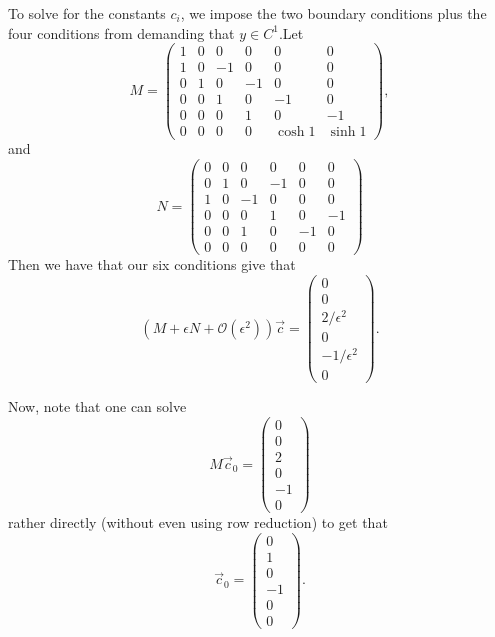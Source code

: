 \begin{example}
To solve for the constants $c_i$, we impose the two boundary conditions plus the four conditions from demanding that $y\in C^1$.Let
\begin{equation}
M = \begin{pmatrix}
1 & 0 & 0 & 0& 0 & 0\\
1 & 0 & -1 & 0 & 0 & 0\\
0 & 1 & 0 & -1 & 0 & 0\\
0 & 0 & 1 & 0 & -1 & 0\\
0 & 0 & 0 & 1 & 0 & -1\\
0 & 0 & 0 & 0 & \cosh 1 & \sinh 1
\end{pmatrix},
\end{equation}
and
\begin{equation}
N = 
\begin{pmatrix}
0 & 0 & 0 & 0 & 0 & 0\\
0 & 1 & 0 & -1 & 0 & 0\\
1 & 0 & -1 & 0 & 0 & 0\\
0 & 0 & 0 & 1 & 0 & -1 \\
0 & 0 & 1 & 0 & -1 & 0\\
0 & 0 & 0 & 0 & 0 & 0
\end{pmatrix}
\end{equation}
Then we have that our six conditions give that
\begin{equation}\label{pde:eq_28}
(M + \epsilon N + \mathcal O (\epsilon^2)) \vec c = \begin{pmatrix}
0\\
0\\
2/\epsilon^2\\
0\\
-1/\epsilon^2\\
0
\end{pmatrix}.
\end{equation}

Now, note that one can solve 
\begin{equation}
M \vec c_0 =  \begin{pmatrix}
0\\
0\\
2\\
0\\
-1\\
0
\end{pmatrix}
\end{equation}
rather directly (without even using row reduction) to get that
\begin{equation}
\vec c_0 = \begin{pmatrix}
0\\
1\\
0\\
-1\\
0\\
0
\end{pmatrix}.
\end{equation}


\end{example}
